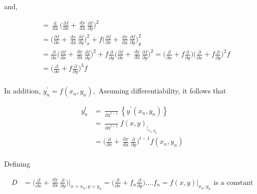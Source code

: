\documentclass[12 pt]{article}
\begin{document}
	and,
	
	\begin{equation*}
		\begin{split}
			\frac{\mathop{\mathrm{d^{3}f}}}{\mathop{\mathrm{dx^{3}}}} &= \frac{\mathop{\mathrm{d}}}{\mathop{\mathrm{dx}}}\bigg(\frac{\partial f}{\partial x} + \frac{\mathop{\mathrm{dy}}}{\mathop{\mathrm{dx}}}\frac{\partial f}{\partial y}\bigg)^{2}\\ 
			&=  \bigg(\frac{\partial f}{\partial x}+\frac{\mathop{\mathrm{dy}}}{\mathop{\mathrm{dx}}}\frac{\partial f}{\partial y}\bigg)^{2}_{x} +   f\bigg(\frac{\partial f}{\partial x}+\frac{\mathop{\mathrm{dy}}}{\mathop{\mathrm{dx}}}\frac{\partial f}{\partial y}\bigg)^{2}_{y}\\
			&= \frac{\partial }{\partial x}\bigg(\frac{\partial f}{\partial x}+\frac{\mathop{\mathrm{dy}}}{\mathop{\mathrm{dx}}}\frac{\partial f}{\partial y}\bigg)^{2}+f\frac{\partial }{\partial y}\bigg(\frac{\partial f}{\partial x}+\frac{\mathop{\mathrm{dy}}}{\mathop{\mathrm{dx}}}\frac{\partial f}{\partial y}\bigg)^{2}=\bigg(\frac{\partial }{\partial x}+f\frac{\partial }{\partial y}\bigg)\bigg(\frac{\partial }{\partial x}+f\frac{\partial }{\partial y}\bigg)^{2}f\\
			&= \bigg(\frac{\partial }{\partial x}+f\frac{\partial }{\partial y}\bigg)^{3}f\\
		\end{split}
	\end{equation*}
	
	
	In addition, $y_{n}^{\prime} = f(x_{n},y_{n}),$ Assuming differentiability, it follows that 
	
	{
		\Large
		\begin{equation}\label{E4}
			\begin{split}
				y_{n}^{t} &= \frac{\mathop{\mathrm{d}^{t-1}}}{\mathop{\mathrm{dx}}^{t-1}} \left\{y^{\prime}(x_{n},y_{n})\right\}\\ 
				&= \frac{\mathop{\mathrm{d}^{t-1}}}{\mathop{\mathrm{dx}}^{t-1}} f(x,y)_{|_{x_{n},y_{n}}}\\
				&= \bigg(\frac{\partial}{\partial x} + \frac{\mathop{\mathrm{dy}}}{\mathop{\mathrm{dx}}}\frac{\partial}{\partial y}\bigg)^{t-1}f(x_{n},y_{n})\\
			\end{split}
		\end{equation}
	}
	
	Defining 
	
	\begin{equation*}
		\begin{split}
			D &= \bigg(\frac{\partial }{\partial x} + {\frac{\mathop{\mathrm{dy}}}{\mathop{\mathrm{dx}}}}\frac{\partial }{\partial y}\bigg)\Big\vert_{x = x_{n}, y= y_{n}} = \bigg(\frac{\partial }{\partial x} + f_{n}\frac{\partial }{\partial y}\bigg)....f_{n} = f(x,y)\vert_{x_{n}, y_{n}}  \text{ is a constant}\\
		\end{split}
	\end{equation*}
	
\end{document}
